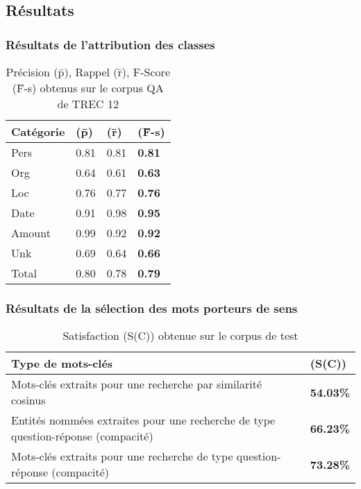\documentclass[xcolor=dvipsnames]{beamer}
\begin{document}
\subsection{Résultats}
\frame
{
    \frametitle{Résultats de l'attribution des classes}
    \begin{table}[h]
        \begin{center}
            \begin{tabular}{|p{2.5cm}|l|l|l|}
                \hline
                Catégorie & (\={p}) & (\={r}) & (\={F}-s) \\
                \hline
                Pers & 0.81 & 0.81 & \textbf{0.81} \\
                \hline
                Org & 0.64 & 0.61 & \textbf{0.63} \\
                \hline
                Loc & 0.76 & 0.77 & \textbf{0.76} \\
                \hline
                Date & 0.91 & 0.98 & \textbf{0.95} \\
                \hline
                Amount & 0.99 & 0.92 & \textbf{0.92} \\
                \hline
                Unk & 0.69 & 0.64 & \textbf{0.66} \\
                \hline
                \hline
                Total & 0.80 & 0.78 & \textbf{0.79} \\
                \hline
            \end{tabular}
            \caption{Précision (\={p}), Rappel (\={r}), F-Score (\={F}-s) obtenus sur le corpus QA de TREC 12}
        \end{center}
    \end{table}
}
\frame
{
    \frametitle{Résultats de la sélection des mots porteurs de sens}
    \begin{table}[htbp]
        \begin{center}
            \begin{tabular}{|p{8cm}|l|}
                \hline
                Type de mots-clés & (S(C)) \\
                \hline
                Mots-clés extraits pour une recherche par similarité cosinus & \textbf{54.03\%} \\
                \hline
                Entités nommées extraites pour une recherche de type question-réponse (compacité) & \textbf{66.23\%} \\
                \hline
                Mots-clés extraits pour une recherche de type question-réponse (compacité) & \textbf{73.28\%} \\
                \hline
            \end{tabular}
            \caption{Satisfaction (S(C)) obtenue sur le corpus de test}
        \end{center}
    \end{table}
}
\end{document}
